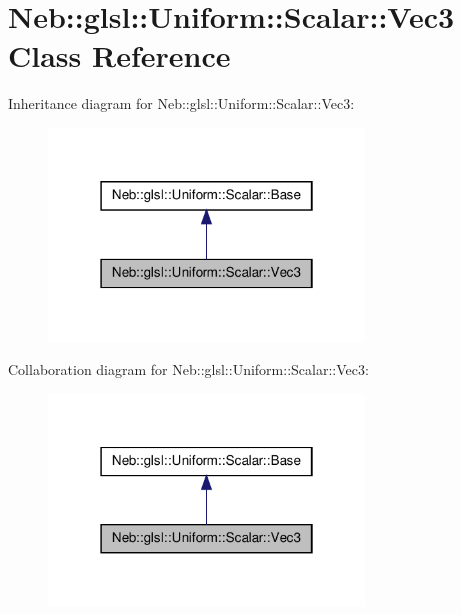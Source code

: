 \hypertarget{classNeb_1_1glsl_1_1Uniform_1_1Scalar_1_1Vec3}{\section{\-Neb\-:\-:glsl\-:\-:\-Uniform\-:\-:\-Scalar\-:\-:\-Vec3 \-Class \-Reference}
\label{classNeb_1_1glsl_1_1Uniform_1_1Scalar_1_1Vec3}
}


\-Inheritance diagram for \-Neb\-:\-:glsl\-:\-:\-Uniform\-:\-:\-Scalar\-:\-:\-Vec3\-:\nopagebreak
\begin{figure}[H]
\begin{center}
\leavevmode
\includegraphics[width=238pt]{classNeb_1_1glsl_1_1Uniform_1_1Scalar_1_1Vec3__inherit__graph}
\end{center}
\end{figure}


\-Collaboration diagram for \-Neb\-:\-:glsl\-:\-:\-Uniform\-:\-:\-Scalar\-:\-:\-Vec3\-:\nopagebreak
\begin{figure}[H]
\begin{center}
\leavevmode
\includegraphics[width=238pt]{classNeb_1_1glsl_1_1Uniform_1_1Scalar_1_1Vec3__coll__graph}
\end{center}
\end{figure}
